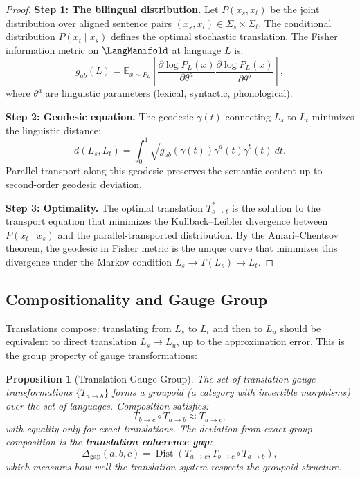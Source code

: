 \documentclass[12pt,a4paper]{article}
\newtheorem{proposition}[theorem]{Proposition}
\theoremstyle{remark}
\newcommand{\E}{\mathbb{E}}
\DeclareMathOperator{\Dist}{Dist}
\begin{document}
\begin{proof}
\noindent\textbf{Step 1: The bilingual distribution.}
Let $P(x_s, x_t)$ be the joint distribution over aligned sentence
pairs $(x_s, x_t) \in \Sigma_s \times \Sigma_t$. The conditional
distribution $P(x_t \mid x_s)$ defines the optimal stochastic
translation. The Fisher information metric on $\LangManifold$ at
language $L$ is:
\begin{equation}
  g_{ab}(L) = \E_{x \sim P_L}\left[
    \frac{\partial \log P_L(x)}{\partial \theta^a}
    \frac{\partial \log P_L(x)}{\partial \theta^b}
  \right],
\end{equation}
where $\theta^a$ are linguistic parameters (lexical, syntactic,
phonological).

\smallskip
\noindent\textbf{Step 2: Geodesic equation.}
The geodesic $\gamma(t)$ connecting $L_s$ to $L_t$ minimizes the
linguistic distance:
\begin{equation}
  d(L_s, L_t) = \int_0^1 \sqrt{g_{ab}(\gamma(t)) \dot\gamma^a(t) \dot\gamma^b(t)} \, dt.
\end{equation}
Parallel transport along this geodesic preserves the semantic
content up to second-order geodesic deviation.

\smallskip
\noindent\textbf{Step 3: Optimality.}
The optimal translation $T_{s\to t}^*$ is the solution to the
transport equation that minimizes the Kullback--Leibler divergence
between $P(x_t \mid x_s)$ and the parallel-transported distribution.
By the Amari--Chentsov theorem, the geodesic in Fisher metric is
the unique curve that minimizes this divergence under the Markov
condition $L_s \to T(L_s) \to L_t$.
\end{proof}

\subsection{Compositionality and Gauge Group}

Translations compose: translating from $L_s$ to $L_t$ and then to
$L_u$ should be equivalent to direct translation $L_s \to L_u$,
up to the approximation error. This is the group property of gauge
transformations:

\begin{proposition}[Translation Gauge Group]
\label{prop:gauge_group}
The set of translation gauge transformations $\{T_{a\to b}\}$ forms
a groupoid (a category with invertible morphisms) over the set of
languages. Composition satisfies:
\begin{equation}
  \label{eq:gauge_group}
  T_{b\to c} \circ T_{a\to b} \approx T_{a\to c},
\end{equation}
with equality only for exact translations. The deviation from
exact group composition is the \textbf{translation coherence gap}:
\begin{equation}
  \Delta_{\text{gap}}(a,b,c) = \Dist(T_{a\to c}, T_{b\to c} \circ T_{a\to b}),
\end{equation}
which measures how well the translation system respects the
groupoid structure.
\end{proposition}
\end{document}
